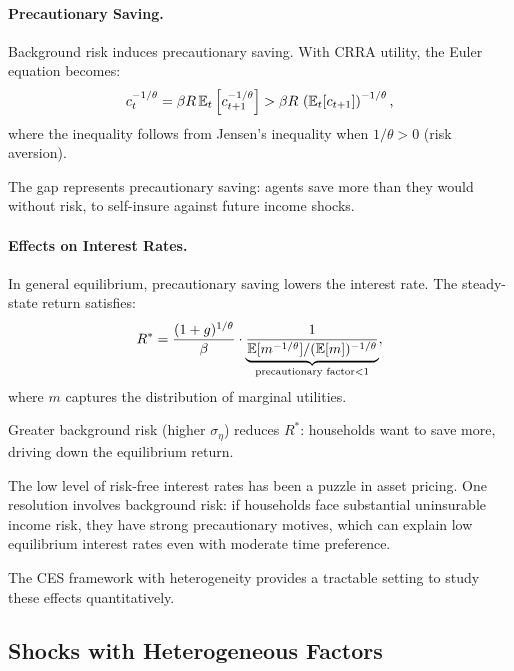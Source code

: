 \paragraph{Precautionary Saving.}
Background risk induces precautionary saving. With CRRA utility, the Euler equation becomes:
\begin{equation}
c_t^{-1/\theta} = \beta R \, \mathbb{E}_t \left[ c_{t+1}^{-1/\theta} \right] > \beta R \, \left( \mathbb{E}_t[c_{t+1}] \right)^{-1/\theta},
\label{eq:precautionary-euler}
\end{equation}
where the inequality follows from Jensen's inequality when $1/\theta > 0$ (risk aversion).

The gap represents precautionary saving: agents save more than they would without risk, to self-insure against future income shocks.

\paragraph{Effects on Interest Rates.}
In general equilibrium, precautionary saving lowers the interest rate. The steady-state return satisfies:
\begin{equation}
R^* = \frac{(1+g)^{1/\theta}}{\beta} \cdot \underbrace{\frac{1}{\mathbb{E}[m^{-1/\theta}] / (\mathbb{E}[m])^{-1/\theta}}}_{\text{precautionary factor} < 1},
\label{eq:interest-rate-precautionary}
\end{equation}
where $m$ captures the distribution of marginal utilities.

Greater background risk (higher $\sigma_\eta$) reduces $R^*$: households want to save more, driving down the equilibrium return.

\begin{calloutnote}
The low level of risk-free interest rates has been a puzzle in asset pricing. One resolution involves background risk: if households face substantial uninsurable income risk, they have strong precautionary motives, which can explain low equilibrium interest rates even with moderate time preference.

The CES framework with heterogeneity provides a tractable setting to study these effects quantitatively.
\end{calloutnote}

\subsection{Shocks with Heterogeneous Factors}
\label{subsec:shocks-heterogeneity}

